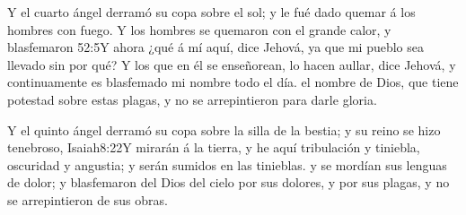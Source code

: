 Y el cuarto ángel derramó su copa sobre el sol; y le fué dado quemar á los hombres con fuego. 
Y los hombres se quemaron con el grande calor, y blasfemaron%
					{52:5}{Y ahora ¿qué á mí aquí, dice Jehová, ya que mi pueblo sea llevado sin por qué? Y los que en él se enseñorean, lo hacen aullar, dice Jehová, y continuamente es blasfemado mi nombre todo el día.}
 el nombre de Dios, que tiene potestad sobre estas plagas, y no se arrepintieron para darle gloria.

Y el quinto ángel derramó su copa sobre la silla de la bestia; y su reino se hizo tenebroso,%
				  {Isaiah}{8:22}{Y mirarán á la tierra, y he aquí tribulación y tiniebla, oscuridad y angustia; y serán sumidos en las tinieblas.}
 y se mordían sus lenguas de dolor; 
y blasfemaron del Dios del cielo%
 por sus dolores, y por sus plagas, y no se arrepintieron de sus obras.

